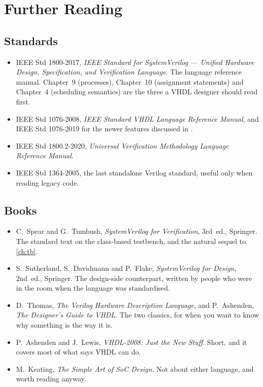 \cleardoublepage
{}
{}
\chapter*{Further Reading}

\section*{Standards}

\begin{itemize}
  \item IEEE Std 1800-2017, \emph{IEEE Standard for SystemVerilog --- Unified
        Hardware Design, Specification, and Verification Language}. The
        language reference manual. Chapter~9 (processes), Chapter~10
        (assignment statements) and Chapter~4 (scheduling semantics) are the
        three a VHDL designer should read first.
  \item IEEE Std 1076-2008, \emph{IEEE Standard VHDL Language Reference
        Manual}, and IEEE Std 1076-2019 for the newer features discussed in
        .
  \item IEEE Std 1800.2-2020, \emph{Universal Verification Methodology
        Language Reference Manual}.
  \item IEEE Std 1364-2005, the last standalone Verilog standard, useful only
        when reading legacy code.
\end{itemize}

\section*{Books}

\begin{itemize}
  \item C.~Spear and G.~Tumbush, \emph{SystemVerilog for Verification},
        3rd~ed., Springer. The standard text on the class-based testbench,
        and the natural sequel to \cref{ch:tb}.
  \item S.~Sutherland, S.~Davidmann and P.~Flake, \emph{SystemVerilog for
        Design}, 2nd~ed., Springer. The design-side counterpart, written by
        people who were in the room when the language was standardised.
  \item D.~Thomas, \emph{The Verilog Hardware Description Language}, and
        P.~Ashenden, \emph{The Designer's Guide to VHDL}. The two classics,
        for when you want to know why something is the way it is.
  \item P.~Ashenden and J.~Lewis, \emph{VHDL-2008: Just the New Stuff}.
        Short, and it covers most of what  says VHDL can do.
  \item M.~Keating, \emph{The Simple Art of SoC Design}. Not about either
        language, and worth reading anyway.
\end{itemize}

